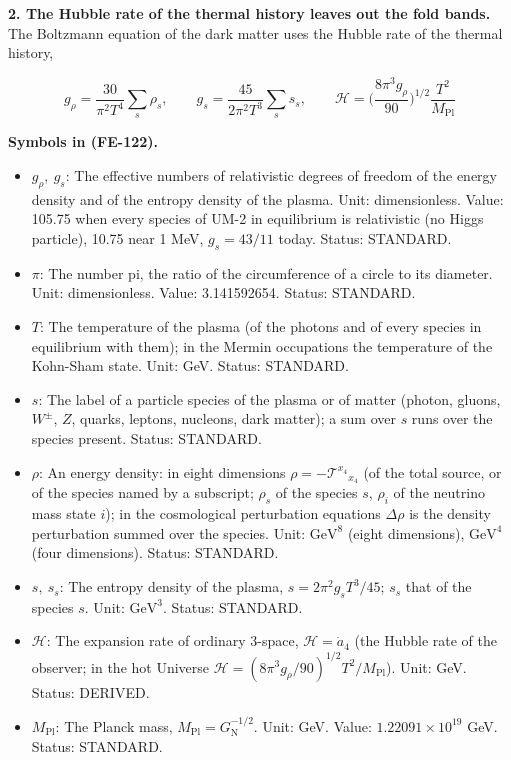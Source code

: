 \documentclass[
  10pt,
]{article}
\providecommand{\tightlist}{%
  \setlength{\itemsep}{0pt}\setlength{\parskip}{0pt}}
\begin{document}
\textbf{2. The Hubble rate of the thermal history leaves out the fold
bands.} The Boltzmann equation of the dark matter uses the Hubble rate
of the thermal history,

\[
g_\rho = \frac{30}{\pi^2T^4}\sum_s\rho_s,\qquad g_s = \frac{45}{2\pi^2T^3}\sum_s s_s,\qquad
\mathcal{H} = \Big(\frac{8\pi^3g_\rho}{90}\Big)^{1/2}\frac{T^2}{M_{\mathrm{Pl}}} \tag{FE-122}
\]

\textbf{Symbols in (FE-122).}

\begin{itemize}
\tightlist
\item
  \(g_\rho,\ g_s\): The effective numbers of relativistic degrees of
  freedom of the energy density and of the entropy density of the
  plasma. Unit: dimensionless. Value: 105.75 when every species of UM-2
  in equilibrium is relativistic (no Higgs particle), 10.75 near 1 MeV,
  \(g_s = 43/11\) today. Status: STANDARD.
\item
  \(\pi\): The number pi, the ratio of the circumference of a circle to
  its diameter. Unit: dimensionless. Value: 3.141592654. Status:
  STANDARD.
\item
  \(T\): The temperature of the plasma (of the photons and of every
  species in equilibrium with them); in the Mermin occupations the
  temperature of the Kohn-Sham state. Unit: GeV. Status: STANDARD.
\item
  \(s\): The label of a particle species of the plasma or of matter
  (photon, gluons, \(W^\pm\), \(Z\), quarks, leptons, nucleons, dark
  matter); a sum over \(s\) runs over the species present. Status:
  STANDARD.
\item
  \(\rho\): An energy density: in eight dimensions
  \(\rho = -\mathcal{T}^{x_4}{}_{x_4}\) (of the total source, or of the
  species named by a subscript; \(\rho_s\) of the species \(s\),
  \(\rho_i\) of the neutrino mass state \(i\)); in the cosmological
  perturbation equations \(\Delta\rho\) is the density perturbation
  summed over the species. Unit: \(\mathrm{GeV}^{8}\) (eight
  dimensions), \(\mathrm{GeV}^{4}\) (four dimensions). Status: STANDARD.
\item
  \(s,\ s_s\): The entropy density of the plasma,
  \(s = 2\pi^2g_sT^3/45\); \(s_s\) that of the species \(s\). Unit:
  \(\mathrm{GeV}^{3}\). Status: STANDARD.
\item
  \(\mathcal{H}\): The expansion rate of ordinary 3-space,
  \(\mathcal{H} = \dot a_4\) (the Hubble rate of the observer; in the
  hot Universe
  \(\mathcal{H} = (8\pi^3g_\rho/90)^{1/2}T^2/M_{\mathrm{Pl}}\)). Unit:
  GeV. Status: DERIVED.
\item
  \(M_{\mathrm{Pl}}\): The Planck mass,
  \(M_{\mathrm{Pl}} = G_{\mathrm{N}}^{-1/2}\). Unit: GeV. Value:
  \(1.22091\times10^{19}\) GeV. Status: STANDARD.
\end{itemize}
\end{document}

